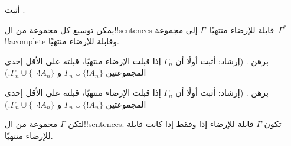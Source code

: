\documentclass[../../../include/open-logic-section]{subfiles}
\begin{document}

\begin{prob}
أثبت .
\end{prob}
\tagendprob

\begin{lem}
 يمكن توسيع كل مجموعة من ال!!{sentence}s
قابلة للإرضاء منتهيًا~$\Gamma$ إلى مجموعة~$\Gamma^*$ !!a{complete}
وقابلة للإرضاء منتهيًا.
\end{lem}

\begin{prob}
برهن . (إرشاد: أثبت أولًا
أن $\Gamma_n$ إذا قبلت الإرضاء منتهيًا، قبلته على الأقل إحدى
المجموعتين $\Gamma_n \cup \{!A_n\}$ و
$\Gamma_n \cup \{\lnot !A_n\}$.)
\end{prob}
\tagendprob

\begin{prob}
برهن . (إرشاد: أثبت أولًا
أن $\Gamma_n$ إذا قبلت الإرضاء منتهيًا، قبلته على الأقل إحدى
المجموعتين $\Gamma_n \cup \{!A_n\}$ و
$\Gamma_n \cup \{\lnot !A_n\}$.)
\end{prob}
\tagendprob

\begin{thm}[التراص]
 لتكن $\Gamma$ مجموعة من ال!!{sentence}s.
تكون $\Gamma$ قابلة للإرضاء إذا وفقط إذا كانت قابلة للإرضاء منتهيًا.
\end{thm}
\end{document}

